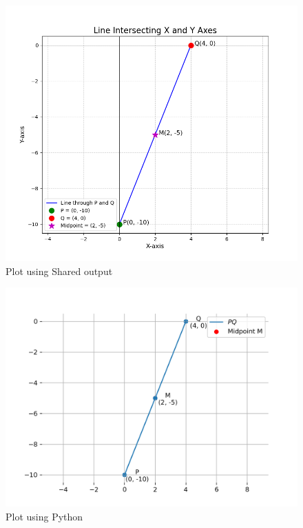 \documentclass[journal]{IEEEtran}
\begin{document}
\begin{figure}[h!]
    \centering
    \includegraphics[width=0.6\columnwidth]{figs/Figure_1.png}
    \caption{Plot using Shared output}
    \label{fig:placeholder}
\end{figure}

\begin{figure}[h!]
    \centering
    \includegraphics[width=0.6\columnwidth]{figs/fig.png}
    \caption{Plot using Python}
    \label{fig:placeholder}
\end{figure}
\end{document}
